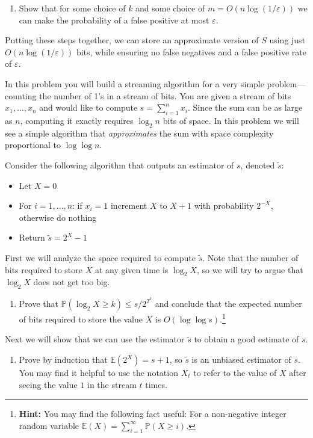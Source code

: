 \documentclass[11pt]{article}
\newcommand{\eps}{\varepsilon}
\theoremstyle{definition}
\begin{document}
\begin{enumerate}[leftmargin=0pt, itemsep=3ex]
\begin{enumerate}[leftmargin=\parindent, itemsep=1ex]
    \item Show that for some choice of $k$ and some choice of $m = O(n \log(1/\eps))$ we can make the probability of a false positive at most $\eps$.
\end{enumerate}
Putting these steps together, we can store an approximate version of $S$ using just $O(n \log(1/\eps))$ bits, while ensuring no false negatives and a false positive rate of $\eps$.

\problemitem In this problem you will build a streaming algorithm for a very simple problem---counting the number of 1's in a stream of bits.  You are given a stream of bits $x_1,\dots,x_n$ and would like to compute $s = \sum_{i=1}^{n} x_i$.  Since the sum can be as large as $n$, computing it exactly requires $\log_2 n$ bits of space.  In this problem we will see a simple algorithm that \emph{approximates} the sum with space complexity proportional to $\log \log n$.

Consider the following algorithm that outputs an estimator of $s$, denoted $\tilde{s}$:
\begin{itemize}[nosep]
    \item Let $X = 0$
    \item For $i = 1,\dots,n$: if $x_i = 1$ increment $X$ to $X+1$ with probability $2^{-X}$, otherwise do nothing
    \item Return $\tilde{s} = 2^X - 1$
\end{itemize}

First we will analyze the space required to compute $\tilde{s}$.  Note that the number of bits required to store $X$ at any given time is $\log_2 X$, so we will try to argue that $\log_2 X$ does not get too big.
\begin{enumerate}[leftmargin=\parindent, itemsep=1ex]
    \item Prove that $\mathbb{P}(\log_2 X \geq k) \leq s / 2^{2^k}$ and conclude that the expected number of bits required to store the value $X$ is $O(\log \log s)$.\footnote{\textbf{Hint:} You may find the following fact useful:  For a non-negative integer random variable $\mathbb{E}(X) = \sum_{i=1}^{\infty} \mathbb{P}(X \geq i)$.}
\end{enumerate}
Next we will show that we can use the estimator $\tilde{s}$ to obtain a good estimate of $s$.

\begin{enumerate}[leftmargin=\parindent, itemsep=1ex]
\addtocounter{enumii}{1}   
    \item Prove by induction that $\mathbb{E}(2^X) = s+1$, so $\tilde{s}$ is an unbiased estimator of $s$.  You may find it helpful to use the notation $X_t$ to refer to the value of $X$ after seeing the value $1$ in the stream $t$ times.
     

\end{enumerate}
\end{enumerate}
\end{document}

